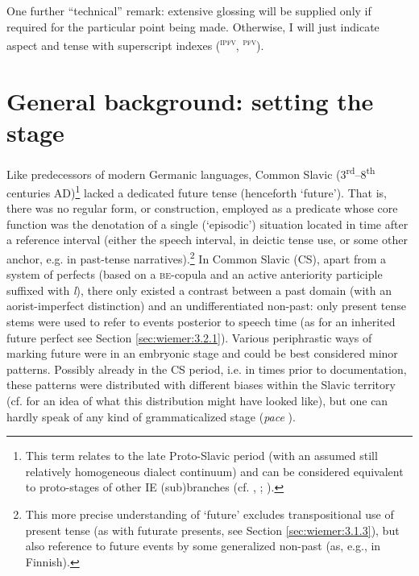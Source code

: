 \documentclass[output=paper,colorlinks,citecolor=brown]{langscibook}
\begin{document}
One further “technical” remark: extensive glossing will be supplied only if required for the particular point being made. Otherwise, I will just indicate aspect and tense with superscript indexes (\textsuperscript{\textsc{ipfv}},\textsuperscript{ \textsc{pfv}}).

\section{General background: setting the stage}\label{sec:wiemer:2}

Like predecessors of modern Germanic languages, Common Slavic (3\textsuperscript{rd}--8\textsuperscript{th} centuries AD)\footnote{This term relates to the late Proto-Slavic period (with an assumed still relatively homogeneous dialect continuum) and can be considered equivalent to proto-stages of other IE (sub)branches (cf. \cite{Andersen1985}, \citeyear{andersen_2006b}; \cite{TownsendJanda1996}).} lacked a dedicated future tense (henceforth ‘future’). That is, there was no regular form, or construction, employed as a predicate whose core function was the denotation of a single (‘episodic’) situation located in time after a reference interval (either the speech interval, in deictic tense use, or some other anchor, e.g. in past-tense narratives).\footnote{This more precise understanding of ‘future’ excludes transpositional use of present tense (as with futurate presents, see Section \ref{sec:wiemer:3.1.3}), but also reference to future events by some generalized non-past (as, e.g., in Finnish).} In Common Slavic (CS), apart from a system of perfects (based on a \textsc{be}-copula and an active anteriority participle suffixed with \textit{l}), there only existed a contrast between a past domain (with an aorist-imperfect distinction) and an undifferentiated non-past: only present tense stems were used to refer to events posterior to speech time (as for an inherited future perfect see Section \ref{sec:wiemer:3.2.1}). Various periphrastic ways of marking future were in an embryonic stage and could be best considered minor patterns. Possibly already in the CS period, i.e. in times prior to documentation, these patterns were distributed with different biases within the Slavic territory (cf. \cite{andersen_2006b} for an idea of what this distribution might have looked like), but one can hardly speak of any kind of grammaticalized stage (\textit{pace} \cite{andersen_2006b}).
\end{document}
